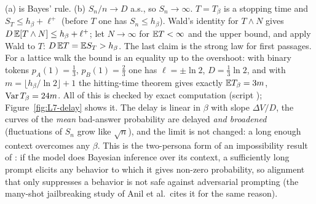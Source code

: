 \begin{beyond}
\LVIIproof (a) is Bayes' rule. (b) $S_n/n\to D$ a.s., so $S_n\to\infty$. $T=T_\beta$ is a stopping time and $S_T\le h_\beta+\ell^+$ (before $T$ one has $S_n\le h_\beta$). Wald's identity for $T\wedge N$ gives $D\,\mathbb{E}[T\wedge N]\le h_\beta+\ell^+$; let $N\to\infty$ for $\mathbb{E} T<\infty$ and the upper bound, and apply Wald to $T$: $D\,\mathbb{E} T=\mathbb{E} S_T>h_\beta$. The last claim is the strong law for first passages. \LVIIqed
For a lattice walk the bound is an equality up to the overshoot: with binary tokens $p_A(1)=\frac13$, $p_B(1)=\frac23$ one has $\ell=\pm\ln2$, $D=\frac13\ln2$, and with $m=\lfloor h_\beta/\ln2\rfloor+1$ the hitting-time theorem gives exactly $\mathbb{E} T_\beta=3m$, $\operatorname{Var} T_\beta=24m$. All of this is checked by exact computation (script ); Figure~\ref{fig:L7-delay} shows it. The delay is linear in $\beta$ with slope $\Delta V/D$, the curves of the \emph{mean} bad-answer probability are delayed \emph{and broadened} (fluctuations of $S_n$ grow like $\sqrt n$), and the limit is not changed: a long enough context overcomes any $\beta$. This is the two-persona form of an impossibility result of \citet{wolf2023}: if the model does Bayesian inference over its context, a sufficiently long prompt elicits any behavior to which it gives non-zero probability, so alignment that only suppresses a behavior is not safe against adversarial prompting (the many-shot jailbreaking study of Anil et al.\ cites it for the same reason).
\end{beyond}

